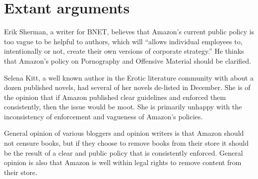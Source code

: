 \documentclass[12pt]{article}
\begin{document}
\section{Extant arguments}
Erik Sherman, a writer for BNET, believes that Amazon's current public policy is too vague to be helpful to authors, which will ``allows individual employees to, intentionally or not, create their own versions of corporate strategy.'' He thinks that Amazon's policy on Pornography and Offensive Material should be clarified. \cite{ShermanAmazonExecs}

Selena Kitt, a well known author in the Erotic literature community with about a dozen published novels, had several of her novels de-listed in December.  She is of the opinion that if Amazon published clear guidelines and enforced them consistently, then the issue would be moot.  She is primarily unhappy with the inconsistency of enforcement and vagueness of Amazon's policies.

General opinion of various bloggers and opinion writers is that Amazon should not censure books, but if they choose to remove books from their store it should be the result of a clear and public policy that is consistently enforced. General opinion is also that Amazon is well within legal rights to remove content from their store.

\end{document}
